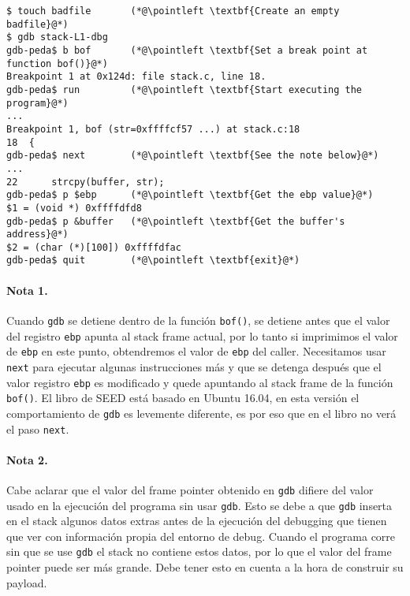 \newcommand{\pointleft}{\reflectbox{\ding{221}}\xspace}

\begin{lstlisting}
$ touch badfile       (*@\pointleft \textbf{Create an empty badfile}@*)
$ gdb stack-L1-dbg
gdb-peda$ b bof       (*@\pointleft \textbf{Set a break point at function bof()}@*)
Breakpoint 1 at 0x124d: file stack.c, line 18.
gdb-peda$ run         (*@\pointleft \textbf{Start executing the program}@*)
...
Breakpoint 1, bof (str=0xffffcf57 ...) at stack.c:18
18  {
gdb-peda$ next        (*@\pointleft \textbf{See the note below}@*)
...
22	    strcpy(buffer, str);
gdb-peda$ p $ebp      (*@\pointleft \textbf{Get the ebp value}@*)
$1 = (void *) 0xffffdfd8   
gdb-peda$ p &buffer   (*@\pointleft \textbf{Get the buffer's address}@*)
$2 = (char (*)[100]) 0xffffdfac
gdb-peda$ quit        (*@\pointleft \textbf{exit}@*)
\end{lstlisting}

  
\paragraph{Nota 1.} Cuando \texttt{gdb} se detiene dentro de la función \texttt{bof()}, se detiene antes que el valor del registro \texttt{ebp} apunta al stack frame actual, por lo tanto si imprimimos el valor de \texttt{ebp} en este punto, obtendremos el valor de \texttt{ebp} del caller. Necesitamos usar \texttt{next} para ejecutar algunas instrucciones más y que se detenga después que el valor registro \texttt{ebp} es modificado y quede apuntando al stack frame de la función \texttt{bof()}.
El libro de SEED está basado en Ubuntu 16.04, en esta versión el comportamiento de \texttt{gdb} es levemente diferente, es por eso que en el libro no verá el paso \texttt{next}.

\paragraph{Nota 2.}
Cabe aclarar que el valor del frame pointer obtenido en \texttt{gdb} difiere del valor usado en la ejecución del programa sin usar \texttt{gdb}. Esto se debe a que \texttt{gdb} inserta en el stack algunos datos extras antes de la ejecución del debugging que tienen que ver con información propia del entorno de debug.
Cuando el programa corre sin que se use \texttt{gdb} el stack no contiene estos datos, por lo que el valor del frame pointer puede ser más grande. Debe tener esto en cuenta a la hora de construir su payload.


